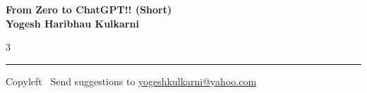 \documentclass[8pt,landscape]{article}
\begin{document}
\footnotesize


\begin{center}
\Large{\textbf{From Zero to ChatGPT!! (Short)\\ Yogesh Haribhau Kulkarni}}
\end{center}

\begin{multicols}{3}

\end{multicols}

\rule{\linewidth}{0.25pt}
\scriptsize
Copyleft \textcopyleft\  Send suggestions to
\href{http://www.yogeshkulkarni.com}{yogeshkulkarni@yahoo.com}
\end{document}
